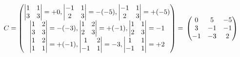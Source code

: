 \documentclass{article}
\begin{document}
$C=
\left (
    \begin{matrix}
        \left |
            \begin{matrix}
                1 & 1\\
                3 & 3
            \end{matrix}
        \right |
        = + 0,
        \left |
            \begin{matrix}
                -1 & 1\\
                2 & 3
            \end{matrix}
        \right |
        = - (-5),
        \left |
            \begin{matrix}
                -1 & 1\\
                2 & 3
            \end{matrix}
        \right |
        = + (-5)\\
        \left |
            \begin{matrix}
                1 & 2\\
                3 & 3
            \end{matrix}
        \right |
        = - (-3),
        \left |
            \begin{matrix}
                1 & 2\\
                2 & 3
            \end{matrix}
        \right |
        = + (-1),
        \left |
            \begin{matrix}
                1 & 1\\
                2 & 3
            \end{matrix}
        \right |
        = - 1\\
        \left |
            \begin{matrix}
                1 & 2\\
                1 & 1
            \end{matrix}
        \right |
        = + (-1),
        \left |
            \begin{matrix}
                1 & 2\\
                -1 & 1
            \end{matrix}
        \right |
        = - 3,
        \left |
            \begin{matrix}
                1 & 1\\
                -1 & 1
            \end{matrix}
        \right |
        = + 2
    \end{matrix}
\right )
=\\
\left (
    \begin{matrix}
        0 & 5 & -5\\
        3 & -1 & -1\\
        -1 & -3 & 2
    \end{matrix}
\right )
$
\end{document}
